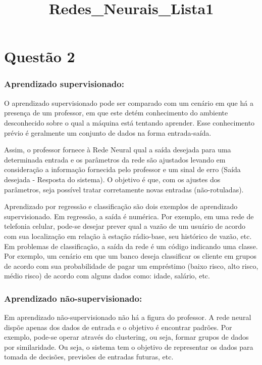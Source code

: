 \documentclass[11pt]{article}
\title{Redes\_Neurais\_Lista1}
\begin{document}
    
    
    \maketitle
    
    

    
    \section{Questão 2}\label{questuxe3o-2}

    \subsubsection{Aprendizado
supervisionado:}\label{aprendizado-supervisionado}

O aprendizado supervisionado pode ser comparado com um cenário em que há
a presença de um professor, em que este detém conhecimento do ambiente
desconhecido sobre o qual a máquina está tentando aprender. Esse
conhecimento prévio é geralmente um conjunto de dados na forma
entrada-saída.

Assim, o professor fornece à Rede Neural qual a saída desejada para uma
determinada entrada e os parâmetros da rede são ajustados levando em
consideração a informação fornecida pelo professor e um sinal de erro
(Saída desejada - Resposta do sistema). O objetivo é que, com os ajustes
dos parâmetros, seja possível tratar corretamente novas entradas
(não-rotuladas).

Aprendizado por regressão e classificação são dois exemplos de
aprendizado supervisionado. Em regressão, a saída é numérica. Por
exemplo, em uma rede de telefonia celular, pode-se desejar prever qual a
vazão de um usuário de acordo com sua localização em relação à estação
rádio-base, seu histórico de vazão, etc. Em problemas de classificação,
a saída da rede é um código indicando uma classe. Por exemplo, um
cenário em que um banco deseja classificar os cliente em grupos de
acordo com sua probabilidade de pagar um empréstimo (baixo risco, alto
risco, médio risco) de acordo com alguns dados como: idade, salário,
etc.

\subsubsection{Aprendizado
não-supervisionado:}\label{aprendizado-nuxe3o-supervisionado}

Em aprendizado não-supervisionado não há a figura do professor. A rede
neural dispõe apenas dos dados de entrada e o objetivo é encontrar
padrões. Por exemplo, pode-se operar através do clustering, ou seja,
formar grupos de dados por similaridade. Ou seja, o sistema tem o
objetivo de representar os dados para tomada de decisões, previsões de
entradas futuras, etc.
\end{document}
